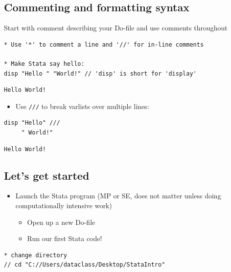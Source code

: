 \documentclass[]{book}
\providecommand{\tightlist}{%
  \setlength{\itemsep}{0pt}\setlength{\parskip}{0pt}}
\begin{document}
\subsection{Commenting and formatting
syntax}\label{commenting-and-formatting-syntax}

Start with comment describing your Do-file and use comments throughout

\begin{verbatim}
* Use '*' to comment a line and '//' for in-line comments

* Make Stata say hello:
disp "Hello " "World!" // 'disp' is short for 'display'
\end{verbatim}

\begin{verbatim}
Hello World!
\end{verbatim}

\begin{itemize}
\tightlist
\item
  Use \texttt{///} to break varlists over multiple lines:
\end{itemize}

\begin{verbatim}
disp "Hello" ///
     " World!"
\end{verbatim}

\begin{verbatim}
Hello World!
\end{verbatim}

\subsection{Let's get started}\label{lets-get-started}

\begin{itemize}
\tightlist
\item
  Launch the Stata program (MP or SE, does not matter unless doing
  computationally intensive work)

  \begin{itemize}
  \tightlist
  \item
    Open up a new Do-file
  \item
    Run our first Stata code!
  \end{itemize}
\end{itemize}

\begin{verbatim}
* change directory
// cd "C://Users/dataclass/Desktop/StataIntro"
\end{verbatim}
\end{document}
